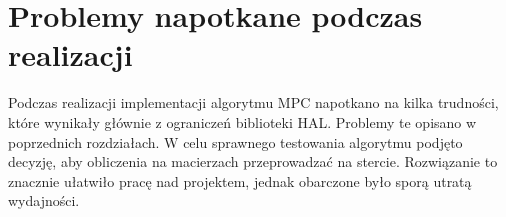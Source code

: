 \section{Problemy napotkane podczas realizacji} \label{sec:problems}
Podczas realizacji implementacji algorytmu MPC napotkano na kilka trudności, które wynikały
głównie z ograniczeń biblioteki HAL. Problemy te opisano w poprzednich rozdziałach.
W celu sprawnego testowania algorytmu podjęto decyzję, aby obliczenia na macierzach przeprowadzać
na stercie. Rozwiązanie to znacznie ułatwiło pracę nad projektem, jednak obarczone było 
sporą utratą wydajności. 
